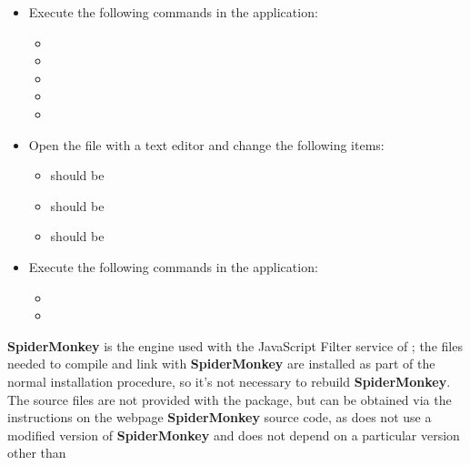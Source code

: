 \tertiaryEnd
{}
\begin{itemize}
\item Execute the following commands in the  application:
\begin{itemize}
\item {}
\item\exSp{}
\item\exSp{}
\item\exSp{}
\item\exSp{}
\end{itemize}
\item\exSp{}Open the file  with a text editor and change the
following items:
\begin{itemize}
\item {} should be 
\item\exSp{} should be 
\item\exSp{} should be 
\end{itemize}
\item\exSp{}Execute the following commands in the  application:
\begin{itemize}
\item \exSp{}
\item\exSp{}
\end{itemize}
\end{itemize}
\tertiaryEnd
\secondaryEnd
\newcommand{\spiderversion}{47a1}%
\textbf{SpiderMonkey} is the  engine used with the JavaScript Filter
service of \mplusm{}; the files needed to compile and link with \textbf{SpiderMonkey} are
installed as part of the normal \mplusm{} installation procedure, so it's not necessary to
rebuild \textbf{SpiderMonkey}.
The source files are not provided with the  package, but can be obtained
via the instructions on the web\longDash{}page
%
{\textbf{SpiderMonkey} source code}, as \mplusm{} does not use a modified version of
\textbf{SpiderMonkey} and does not depend on a particular version \longDash{} other than
